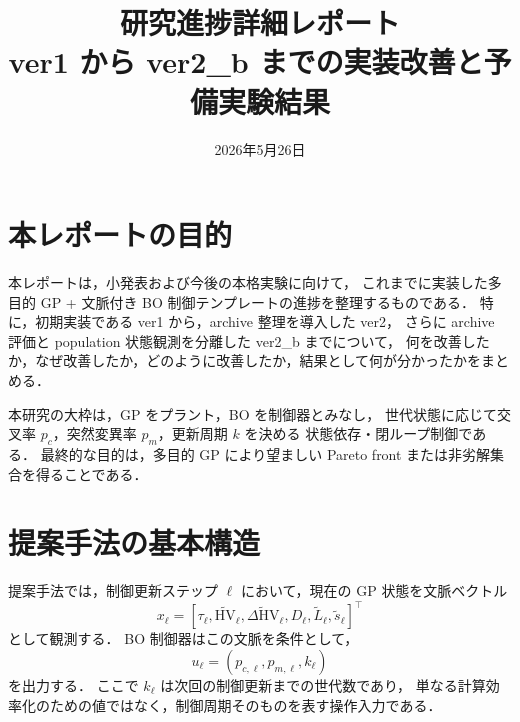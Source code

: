 \documentclass[a4paper,11pt]{ltjsarticle}
\title{研究進捗詳細レポート\\ver1 から ver2\_b までの実装改善と予備実験結果}
\author{}
\date{2026年5月26日}
\newcommand{\HV}{\mathrm{HV}}
\begin{document}
\maketitle

\section{本レポートの目的}

本レポートは，小発表および今後の本格実験に向けて，
これまでに実装した多目的 GP + 文脈付き BO 制御テンプレートの進捗を整理するものである．
特に，初期実装である ver1 から，archive 整理を導入した ver2，
さらに archive 評価と population 状態観測を分離した ver2\_b までについて，
何を改善したか，なぜ改善したか，どのように改善したか，結果として何が分かったかをまとめる．

本研究の大枠は，GP をプラント，BO を制御器とみなし，
世代状態に応じて交叉率 \(p_c\)，突然変異率 \(p_m\)，更新周期 \(k\) を決める
状態依存・閉ループ制御である．
最終的な目的は，多目的 GP により望ましい Pareto front または非劣解集合を得ることである．

\section{提案手法の基本構造}

提案手法では，制御更新ステップ \(\ell\) において，現在の GP 状態を文脈ベクトル
\[
x_\ell =
[
\tau_\ell,
\widetilde{\HV}_\ell,
\widetilde{\Delta \HV}_\ell,
D_\ell,
\widetilde{L}_\ell,
\widetilde{s}_\ell
]^\top
\]
として観測する．
BO 制御器はこの文脈を条件として，
\[
u_\ell=(p_{c,\ell},p_{m,\ell},k_\ell)
\]
を出力する．
ここで \(k_\ell\) は次回の制御更新までの世代数であり，
単なる計算効率化のための値ではなく，制御周期そのものを表す操作入力である．
\end{document}
